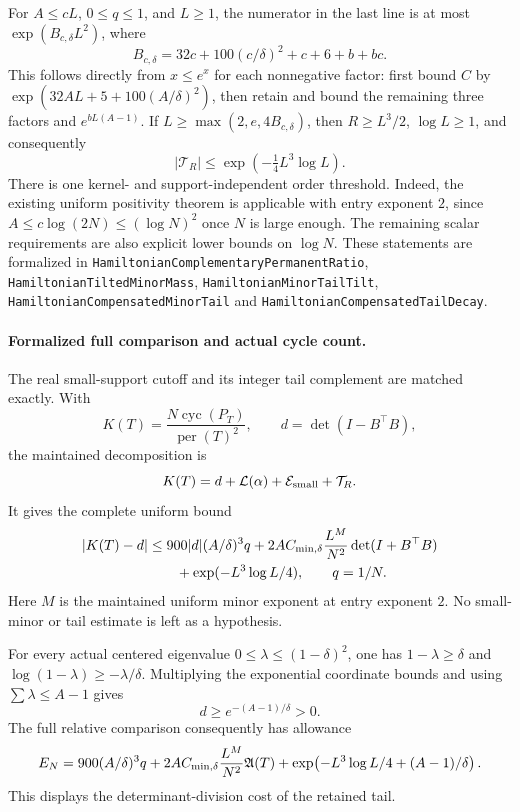 For \(A\leq cL\), \(0\leq q\leq1\), and \(L\geq1\), the numerator
in the last line is at most \(\exp(B_{c,\delta}L^2)\), where
\[
 B_{c,\delta}=32c+100(c/\delta)^2+c+6+b+bc.
\]
This follows directly from \(x\leq e^x\) for each nonnegative
factor: first bound \(C\) by
\(\exp(32AL+5+100(A/\delta)^2)\), then retain and bound the
remaining three factors and \(e^{bL(A-1)}\).
If \(L\geq\max(2,e,4B_{c,\delta})\), then
\(R\geq L^3/2\), \(\log L\geq1\), and consequently
\[
 \boxed{\quad
 |\mathcal T_R|
 \leq \exp\!\left(-\tfrac14L^3\log L\right).
 \quad}
\]
There is one kernel- and support-independent order threshold.
Indeed, the existing uniform positivity theorem is applicable with
entry exponent \(2\), since \(A\leq c\log(2N)\leq(\log N)^2\)
once \(N\) is large enough.  The remaining scalar requirements are
also explicit lower bounds on \(\log N\).
These statements are formalized in
\texttt{HamiltonianComplementaryPermanentRatio},
\texttt{HamiltonianTiltedMinorMass},
\texttt{HamiltonianMinorTailTilt},
\texttt{HamiltonianCompensatedMinorTail} and
\texttt{HamiltonianCompensatedTailDecay}.
\paragraph{Formalized full comparison and actual cycle count.}
The real small-support cutoff and its integer tail complement are
matched exactly.  With
\[
 K(T)=\frac{N\operatorname{cyc}(P_T)}{\operatorname{per}(T)^2},
 \qquad d=\det(I-B^\top B),
\]
the maintained decomposition is
\[
 K(T)=d+\mathcal L(\alpha)+\mathcal E_{\rm small}+\mathcal T_R.
\]
It gives the complete uniform bound
\[
 \begin{split}
 |K(T)-d|
 &\leq900|d|(A/\delta)^3q
   +2A C_{\rm min,\delta}\frac{L^M}{N^2}\det(I+B^\top B)\\
 &\qquad+\exp(-L^3\log L/4),
 \qquad q=1/N .
 \end{split}
\]
Here \(M\) is the maintained uniform minor exponent at entry exponent
\(2\).  No small-minor or tail estimate is left as a hypothesis.

For every actual centered eigenvalue
\(0\leq\lambda\leq(1-\delta)^2\), one has
\(1-\lambda\geq\delta\) and
\(\log(1-\lambda)\geq-\lambda/\delta\).
Multiplying the exponential coordinate bounds and using
\(\sum\lambda\leq A-1\) gives
\[
 d\geq e^{-(A-1)/\delta}>0.
\]
The full relative comparison consequently has allowance
\[
 E_N=
 900(A/\delta)^3q+
 2A C_{\rm min,\delta}\frac{L^M}{N^2}\mathfrak A(T)
 +\exp\!\left(-L^3\log L/4+(A-1)/\delta\right).
\]
This displays the determinant-division cost of the retained tail.

